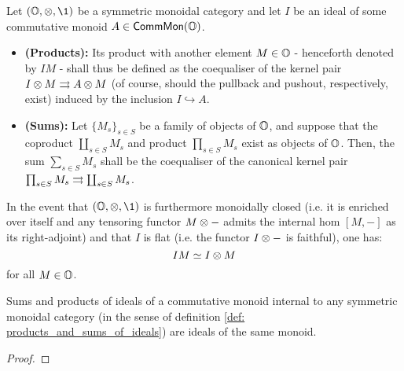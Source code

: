                 \begin{definition} \label{def: products_and_sums_of_ideals}
                    Let $(\O, \tensor, \1)$ be a symmetric monoidal category and let $I$ be an ideal of some commutative monoid $A \in \mathsf{Comm}\mathsf{Mon}(\mathbb{O})$. 
                        \begin{itemize}
                            \item \textbf{(Products):} Its product with another element $M \in \mathbb{O}$ - henceforth denoted by $IM$ - shall thus be defined as the coequaliser of the kernel pair $I \tensor M \toto A \tensor M$ (of course, should the pullback and pushout, respectively, exist) induced by the inclusion $I \hookrightarrow A$.
                            \item \textbf{(Sums):} Let $\{M_s\}_{s \in S}$ be a family of objects of $\mathbb{O}$, and suppose that the coproduct $\coprod_{s \in S} M_s$ and product $\prod_{s \in S} M_s$ exist as objects of $\mathbb{O}$. Then, the sum $\sum_{s \in S} M_s$ shall be the coequaliser of the canonical kernel pair $\prod_{s \in S} M_s \rightrightarrows \coprod_{s \in S} M_s$.  
                        \end{itemize}
                \end{definition}
                \begin{remark}
                    In the event that $(\O, \tensor, \1)$ is furthermore monoidally closed (i.e. it is enriched over itself and any tensoring functor $M \tensor -$ admits the internal hom $[M,- ]$ as its right-adjoint) and that $I$ is flat (i.e. the functor $I \tensor -$ is faithful), one has:
                        $$IM \cong I \tensor M$$
                    for all $M \in \mathbb{O}$.
                \end{remark}
                
                \begin{proposition} \label{prop: products_and_sums_of_ideals_are_ideals}
                    Sums and products of ideals of a commutative monoid internal to any symmetric monoidal category (in the sense of definition \ref{def: products_and_sums_of_ideals}) are ideals of the same monoid.
                \end{proposition}
                    \begin{proof}
                                    
                    \end{proof}
                
